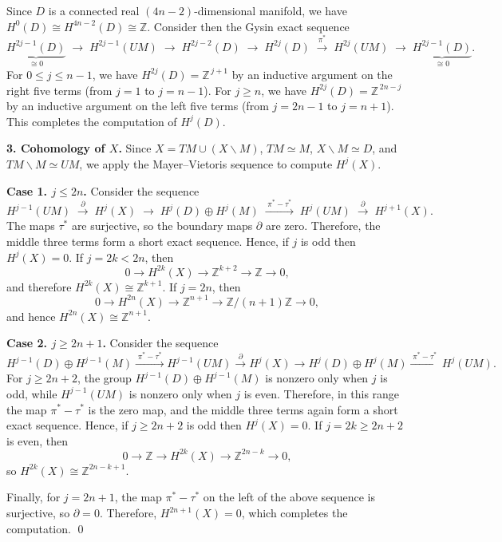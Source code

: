 \documentclass[a4paper, 12pt]{article}
\newcommand{\oX}{X}
\newcommand{\bZ}{\mathbb{Z}}
\begin{document}
Since \(D\) is a connected real \((4n-2)\)-dimensional manifold, we have \(H^0(D)\cong H^{4n-2}(D)\cong \bZ\). Consider then the Gysin exact sequence
\[
\underbrace{H^{2j-1}(D)}_{\cong 0}
\;\longrightarrow\;
H^{2j-1}(UM)\;\longrightarrow\;
H^{2j-2}(D)\;\longrightarrow\;
H^{2j}(D)\;\stackrel{\pi^*}{\longrightarrow}\;
H^{2j}(UM)\;\longrightarrow\;
\underbrace{H^{2j-1}(D)}_{\cong 0}.
\]
For \(0 \leq j \leq n-1\), we have \(H^{2j}(D)=\bZ^{\,j+1}\) by an inductive argument on the right five terms (from \(j=1\) to \(j=n-1\)). For \(j \geq n\), we have \(H^{2j}(D)=\bZ^{\,2n-j}\) by an inductive argument on the left five terms (from \(j=2n-1\) to \(j=n+1\)). This completes the computation of \(H^j(D)\).

\noindent\textbf{3. Cohomology of $X$.} Since $X=TM\cup(X\backslash M)$, $TM\simeq M$, $X\backslash M \simeq D$, and $TM\backslash M\simeq UM$, we apply the Mayer--Vietoris sequence to compute $H^j(\oX)$.

\smallskip
\noindent\textbf{Case 1. $j\le 2n$.}
Consider the sequence
\[
H^{j-1}(UM)\;\xrightarrow{\;\partial\;}\;H^j(\oX)\;\longrightarrow\;H^j(D)\oplus H^j(M)
\;\xrightarrow{\;\pi^*-\tau^*\;}\;
H^j(UM)\;\xrightarrow{\;\partial\;}\;H^{j+1}(\oX).
\]
The maps $\tau^*$ are surjective, so the boundary maps $\partial$ are zero. Therefore, the middle three terms form a short exact sequence. Hence, if $j$ is odd then $H^j(\oX)=0$. If $j=2k<2n$, then
\[
0\to H^{2k}(\oX)\to \mathbb{Z}^{k+2}\to \mathbb{Z}\to 0,
\]
and therefore $H^{2k}(\oX)\cong \mathbb{Z}^{k+1}$. If $j=2n$, then
\[
0\to H^{2n}(\oX)\to \mathbb{Z}^{n+1}\to \mathbb{Z}/(n+1)\mathbb{Z}\to 0,
\]
and hence $H^{2n}(\oX)\cong \mathbb{Z}^{n+1}$.

\smallskip
\noindent\textbf{Case 2. $j\ge 2n+1$.}
Consider the sequence
\[
H^{j-1}(D)\oplus H^{j-1}(M)\xrightarrow{\;\pi^*-\tau^*\;}H^{j-1}(UM)\xrightarrow{\;\partial\;}
H^{j}(\oX)\longrightarrow H^{j}(D)\oplus H^{j}(M)
\xrightarrow{\;\pi^*-\tau^*\;}H^{j}(UM).
\]
For $j\ge 2n+2$, the group $H^{j-1}(D)\oplus H^{j-1}(M)$ is nonzero only when $j$ is odd, while $H^{j-1}(UM)$ is nonzero only when $j$ is even. Therefore, in this range the map $\pi^*-\tau^*$ is the zero map, and the middle three terms again form a short exact sequence. Hence, if $j\ge 2n+2$ is odd then $H^j(\oX)=0$. If $j=2k \ge 2n+2$ is even, then
\[
0\to \mathbb{Z}\to H^{2k}(\oX)\to \mathbb{Z}^{2n-k}\to 0,
\]
so $H^{2k}(\oX)\cong \mathbb{Z}^{2n-k+1}$.

Finally, for $j=2n+1$, the map $\pi^*-\tau^*$ on the left of the above sequence is surjective, so $\partial=0$. Therefore, $H^{2n+1}(\oX)=0$, which completes the computation.
\qed
\end{document}
